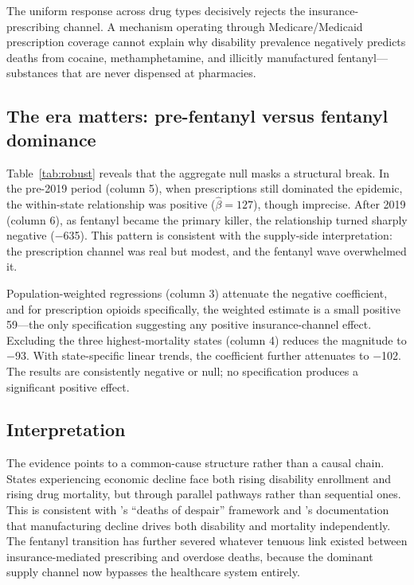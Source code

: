\documentclass[12pt]{article}
\begin{document}
The uniform response across drug types decisively rejects the insurance-prescribing channel. A mechanism operating through Medicare/Medicaid prescription coverage cannot explain why disability prevalence negatively predicts deaths from cocaine, methamphetamine, and illicitly manufactured fentanyl---substances that are never dispensed at pharmacies.



\subsection{The era matters: pre-fentanyl versus fentanyl dominance}

Table~\ref{tab:robust} reveals that the aggregate null masks a structural break. In the pre-2019 period (column 5), when prescriptions still dominated the epidemic, the within-state relationship was positive ($\hat{\beta} = 127$), though imprecise. After 2019 (column 6), as fentanyl became the primary killer, the relationship turned sharply negative ($-$635). This pattern is consistent with the supply-side interpretation: the prescription channel was real but modest, and the fentanyl wave overwhelmed it.

Population-weighted regressions (column 3) attenuate the negative coefficient, and for prescription opioids specifically, the weighted estimate is a small positive 59---the only specification suggesting any positive insurance-channel effect. Excluding the three highest-mortality states (column 4) reduces the magnitude to $-$93. With state-specific linear trends, the coefficient further attenuates to $-$102. The results are consistently negative or null; no specification produces a significant positive effect.



\subsection{Interpretation}

The evidence points to a common-cause structure rather than a causal chain. States experiencing economic decline face both rising disability enrollment and rising drug mortality, but through parallel pathways rather than sequential ones. This is consistent with \citet{case2017}'s ``deaths of despair'' framework and \citet{charles2019}'s documentation that manufacturing decline drives both disability and mortality independently. The fentanyl transition has further severed whatever tenuous link existed between insurance-mediated prescribing and overdose deaths, because the dominant supply channel now bypasses the healthcare system entirely.
\end{document}
